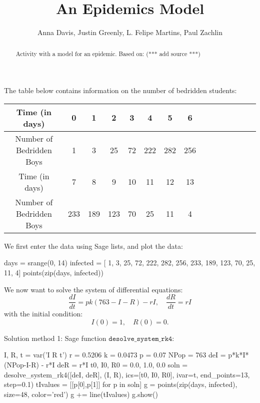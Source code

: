 \documentclass{ximera}
\title{An Epidemics Model}
\author{Anna Davis, Justin Greenly, L. Felipe Martins, Paul Zachlin}
\begin{document}
\begin{abstract}
Activity with a model for an epidemic. Based on: (*** add source ***)
\end{abstract}

\maketitle

The table below contains information on the number of bedridden students:

\begin{tabular}{|c|c|c|c|c|c|c|c|c|c|c|c|c|c|c|}\hline
Time (in days)           & 0 & 1 &  2 &  3 &  4 &    5 &   6  \\\hline
Number of Bedridden Boys & 1 & 3 & 25 & 72 & 222 & 282 & 256 \\\hline\hline
Time (in days) &             7 &   8 &   9 & 10 & 11 & 12 & 13\\\hline
Number of Bedridden Boys & 233 & 189 & 123 & 70 & 25 & 11 &  4\\\hline
\end{tabular}

We first enter the data using Sage lists, and plot the data:

\begin{sageCell}
days = srange(0, 14)
infected = [  1,   3,  25, 72, 222, 282, 256, 
            233, 189, 123, 70,  25,  11,   4]
points(zip(days, infected))
\end{sageCell}

We now want to solve the system of differential equations:
\[
\frac{dI}{dt}=pk(763-I-R)-rI,\quad\frac{dR}{dt}=rI
\]
with the initial condition:
\[
I(0)=1,\quad R(0)=0.
\]

Solution method 1: Sage function $\mathtt{desolve\_system\_rk4}$:

\begin{sageCell}
I, R, t = var('I R t')
r = 0.5206
k = 0.0473
p = 0.07
NPop = 763
deI = p*k*I*(NPop-I-R) - r*I
deR = r*I
t0, I0, R0 = 0.0, 1.0, 0.0
soln = desolve_system_rk4([deI, deR], (I, R), 
                          ics=[t0, I0, R0], ivar=t,
                          end_points=13, step=0.1)
tIvalues = [[p[0],p[1]] for p in soln]
g = points(zip(days, infected), size=48, color='red')
g += line(tIvalues)
g.show()
\end{sageCell}
\end{document}
